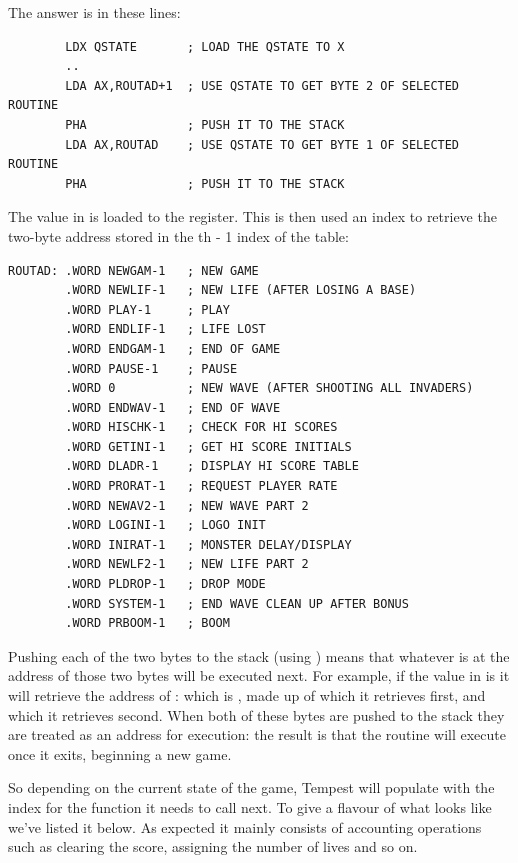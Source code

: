 The answer is in these lines:
\begin{lstlisting}
        LDX QSTATE       ; LOAD THE QSTATE TO X
        ..
        LDA AX,ROUTAD+1  ; USE QSTATE TO GET BYTE 2 OF SELECTED ROUTINE
        PHA              ; PUSH IT TO THE STACK
        LDA AX,ROUTAD    ; USE QSTATE TO GET BYTE 1 OF SELECTED ROUTINE
        PHA              ; PUSH IT TO THE STACK
\end{lstlisting}

The value in  is loaded to the  register. This is then used an index to retrieve the two-byte address
stored in the th - 1 index of the  table: 
\begin{lstlisting}
ROUTAD: .WORD NEWGAM-1   ; NEW GAME
        .WORD NEWLIF-1   ; NEW LIFE (AFTER LOSING A BASE)
        .WORD PLAY-1     ; PLAY
        .WORD ENDLIF-1   ; LIFE LOST
        .WORD ENDGAM-1   ; END OF GAME
        .WORD PAUSE-1    ; PAUSE
        .WORD 0          ; NEW WAVE (AFTER SHOOTING ALL INVADERS)
        .WORD ENDWAV-1   ; END OF WAVE
        .WORD HISCHK-1   ; CHECK FOR HI SCORES
        .WORD GETINI-1   ; GET HI SCORE INITIALS
        .WORD DLADR-1    ; DISPLAY HI SCORE TABLE
        .WORD PRORAT-1   ; REQUEST PLAYER RATE
        .WORD NEWAV2-1   ; NEW WAVE PART 2
        .WORD LOGINI-1   ; LOGO INIT
        .WORD INIRAT-1   ; MONSTER DELAY/DISPLAY
        .WORD NEWLF2-1   ; NEW LIFE PART 2
        .WORD PLDROP-1   ; DROP MODE
        .WORD SYSTEM-1   ; END WAVE CLEAN UP AFTER BONUS
        .WORD PRBOOM-1   ; BOOM
\end{lstlisting}

Pushing each of the two bytes to the stack (using ) means that whatever is at the address of those two bytes will
be executed next. For example, if the value in  is  it will retrieve the address of : which is
, made up of  which it retrieves first, and  which it retrieves second. When both of these bytes
are pushed to the stack they are treated as an address for execution: the result is that the  routine will execute
 once it exits, beginning a new game. 

So depending on the current state of the game, Tempest will populate  with the index for the function it needs
to call next. To give a flavour of what  looks like we've listed it below. As expected it mainly consists of 
accounting operations such as clearing the score, assigning the number of lives and so on. 

